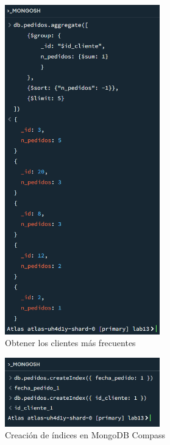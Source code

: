 \begin{figure}[H]
    \centering
    \includegraphics[width=0.6\textwidth]{./p1_kmasfrecuentes.png}
    \caption{Obtener los clientes más frecuentes}\label{fig:kmasfrecuentes}
\end{figure}

\begin{figure}[H]
    \centering
    \includegraphics[width=0.6\textwidth]{./p1_creacionindices.png}
    \caption{Creación de índices en MongoDB Compass}\label{fig:creacionindices}
\end{figure}

